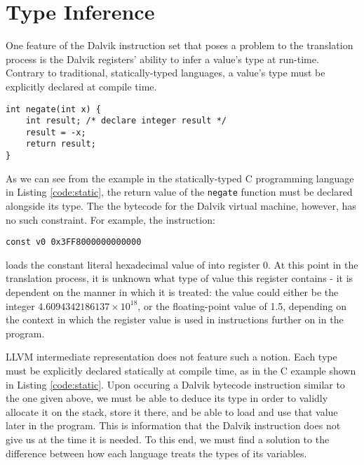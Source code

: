 

\section{Type Inference}

One feature of the Dalvik instruction set that poses a problem to the translation process is the Dalvik registers' ability to infer a value's type at run-time. Contrary to traditional, statically-typed languages, a value's type must be explicitly declared at compile time.

\lstset{
	language=C,
	basicstyle=\small,
	stringstyle=\ttfamily
}

\begin{lstlisting}[frame=single, caption={C example}, label=code:static]
int negate(int x) {
    int result; /* declare integer result */
    result = -x;
    return result;
}
\end{lstlisting}

As we can see from the example in the statically-typed C programming language in Listing \ref{code:static}, the return value of the \verb|negate| function must be declared alongside its type. The the bytecode for the Dalvik virtual machine, however, has no such constraint. For example, the instruction:

\lstset{
	language=Assembly,
	basicstyle=\small,
	stringstyle=\ttfamily
}

\begin{lstlisting}[]
const v0 0x3FF8000000000000
\end{lstlisting}

loads the constant literal hexadecimal value of  into register 0. At this point in the translation process, it is unknown what type of value this register contains - it is dependent on the manner in which it is treated: the value could either be the integer $4.6094342186137 \times 10^{18}$, or the floating-point value of 1.5, depending on the context in which the register value is used in instructions further on in the program.

LLVM intermediate representation does not feature such a notion. Each type must be explicitly declared statically at compile time, as in the C example shown in Listing \ref{code:static}. Upon occuring a Dalvik bytecode instruction similar to the one given above, we must be able to deduce its type in order to validly allocate it on the stack, store it there, and be able to load and use that value later in the program. This is information that the Dalvik instruction does not give us at the time it is needed. To this end, we must find a solution to the difference between how each language treats the types of its variables.

